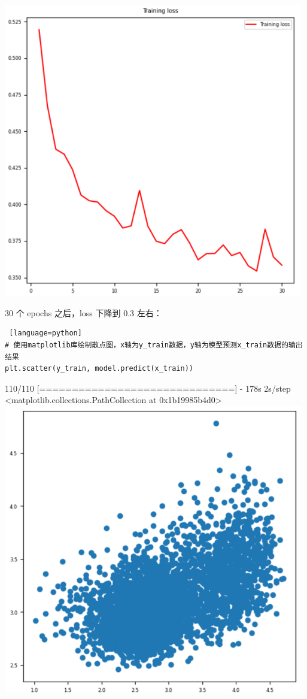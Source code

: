 \documentclass{article}
\begin{document}
\includegraphics[width=0.98\textwidth]{2.png}

30 个 epochs 之后，loss 下降到 0.3 左右：
\begin{lstlisting} [language=python]
# 使用matplotlib库绘制散点图，x轴为y_train数据，y轴为模型预测x_train数据的输出结果  
plt.scatter(y_train, model.predict(x_train))
\end{lstlisting}
110/110 [==============================] - 178s 2s/step\\
<matplotlib.collections.PathCollection at 0x1b19985b4d0>\\
\includegraphics[width=0.98\textwidth]{3.png}
\end{document}
